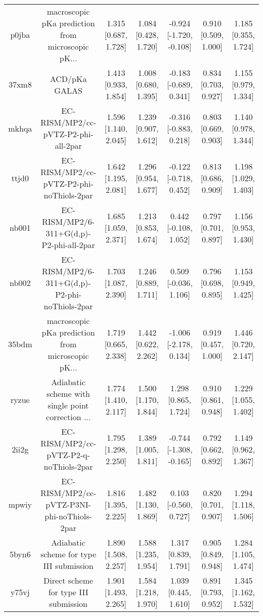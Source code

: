 \documentclass{article}
\begin{document}
\begin{center}
\begin{longtable}{|ccccccc|}
 p0jba &  macroscopic pKa prediction from microscopic pK... &  1.315 [0.687, 1.728] &  1.084 [0.428, 1.720] &  -0.924 [-1.720, -0.108] &  0.910 [0.509, 1.000] &   1.185 [0.355, 1.724] \\
 37xm8 &                                      ACD/pKa GALAS &  1.413 [0.933, 1.854] &  1.008 [0.680, 1.395] &   -0.183 [-0.689, 0.341] &  0.834 [0.703, 0.927] &   1.155 [0.979, 1.334] \\
 mkhqa &                EC-RISM/MP2/cc-pVTZ-P2-phi-all-2par &  1.596 [1.140, 2.045] &  1.239 [0.907, 1.612] &   -0.316 [-0.883, 0.218] &  0.803 [0.669, 0.903] &   1.140 [0.978, 1.344] \\
 ttjd0 &           EC-RISM/MP2/cc-pVTZ-P2-phi-noThiols-2par &  1.642 [1.195, 2.081] &  1.296 [0.954, 1.677] &   -0.122 [-0.718, 0.452] &  0.813 [0.686, 0.909] &   1.198 [1.029, 1.403] \\
 nb001 &           EC-RISM/MP2/6-311+G(d,p)-P2-phi-all-2par &  1.685 [1.059, 2.371] &  1.213 [0.853, 1.674] &    0.442 [-0.108, 1.052] &  0.797 [0.701, 0.897] &   1.156 [0.953, 1.430] \\
 nb002 &      EC-RISM/MP2/6-311+G(d,p)-P2-phi-noThiols-2par &  1.703 [1.087, 2.390] &  1.246 [0.889, 1.711] &    0.509 [-0.036, 1.106] &  0.796 [0.698, 0.895] &   1.153 [0.949, 1.425] \\
 35bdm &  macroscopic pKa prediction from microscopic pK... &  1.719 [0.665, 2.338] &  1.442 [0.622, 2.262] &   -1.006 [-2.178, 0.134] &  0.919 [0.457, 1.000] &   1.446 [0.720, 2.147] \\
 ryzue &  Adiabatic scheme with single point correction ... &  1.774 [1.410, 2.117] &  1.500 [1.170, 1.844] &     1.298 [0.865, 1.724] &  0.910 [0.861, 0.948] &   1.229 [1.055, 1.402] \\
 2ii2g &             EC-RISM/MP2/cc-pVTZ-P2-q-noThiols-2par &  1.795 [1.298, 2.250] &  1.389 [1.005, 1.811] &  -0.744 [-1.308, -0.165] &  0.792 [0.662, 0.892] &   1.149 [0.962, 1.367] \\
 mpwiy &         EC-RISM/MP2/cc-pVTZ-P3NI-phi-noThiols-2par &  1.816 [1.395, 2.225] &  1.482 [1.130, 1.869] &    0.103 [-0.560, 0.727] &  0.820 [0.701, 0.907] &   1.294 [1.118, 1.506] \\
 5byn6 &           Adiabatic scheme for type III submission &  1.890 [1.508, 2.257] &  1.588 [1.235, 1.954] &     1.317 [0.839, 1.791] &  0.905 [0.849, 0.948] &   1.284 [1.105, 1.474] \\
 y75vj &              Direct scheme for type III submission &  1.901 [1.493, 2.265] &  1.584 [1.218, 1.970] &     1.039 [0.445, 1.610] &  0.891 [0.793, 0.952] &   1.345 [1.162, 1.532] \\

\end{longtable}
\end{center}
\end{document}
